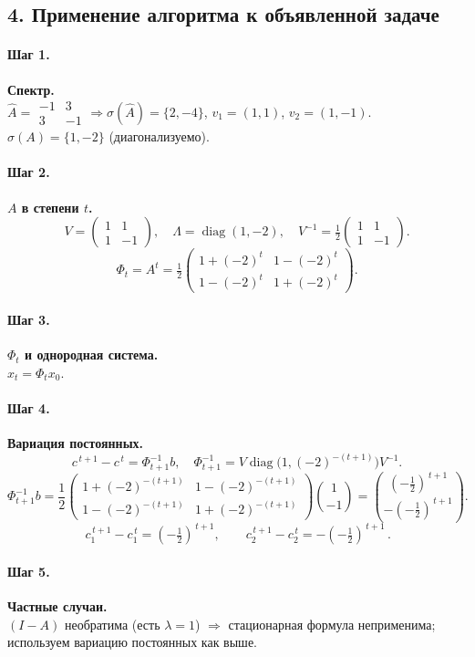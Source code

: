 \subsection*{4. Применение алгоритма к объявленной задаче}

\paragraph{Шаг 1.} \textbf{Спектр.}\\
\(\widehat{A}=\begin{smallmatrix}-1&3\\ 3&-1\end{smallmatrix}\Rightarrow \sigma(\widehat{A})=\{2,-4\}\), \(v_1=(1,1)\), \(v_2=(1,-1)\).  
\(\sigma(A)=\{1,-2\}\) (диагонализуемо).

\paragraph{Шаг 2.} \textbf{\(A\) в степени \(t\).}\\
\[
V=\begin{pmatrix}1&1\\ 1&-1\end{pmatrix},\quad
\Lambda=\operatorname{diag}(1,-2),\quad
V^{-1}=\tfrac12\begin{pmatrix}1&1\\ 1&-1\end{pmatrix}.
\]
\[
\Phi_t=A^t=\tfrac12\begin{pmatrix}1+(-2)^t & 1-(-2)^t\\ 1-(-2)^t & 1+(-2)^t\end{pmatrix}.
\]

\paragraph{Шаг 3.} \textbf{\(\Phi_t\) и однородная система.}\\
\(x_t=\Phi_t x_0\).

\paragraph{Шаг 4.} \textbf{Вариация постоянных.}\\
\[
c^{\,t+1}-c^{\,t}=\Phi_{t+1}^{-1}b,\quad
\Phi_{t+1}^{-1}=V\operatorname{diag}\!\bigl(1,(-2)^{-(t+1)}\bigr)V^{-1}.
\]
\[
\Phi_{t+1}^{-1}b=\frac12\!\begin{pmatrix}1+(-2)^{-(t+1)} & 1-(-2)^{-(t+1)}\\ 1-(-2)^{-(t+1)} & 1+(-2)^{-(t+1)}\end{pmatrix}\!\!\binom{1}{-1}
=\binom{(-\tfrac12)^{\,t+1}}{-(-\tfrac12)^{\,t+1}}.
\]
\[
\boxed{\,c_1^{\,t+1}-c_1^{\,t}=(-\tfrac12)^{\,t+1},\qquad c_2^{\,t+1}-c_2^{\,t}=-(-\tfrac12)^{\,t+1}\,}.
\]

\paragraph{Шаг 5.} \textbf{Частные случаи.}\\
\((I-A)\) необратима (есть \(\lambda=1\)) \(\Rightarrow\) стационарная формула неприменима; используем вариацию постоянных как выше.